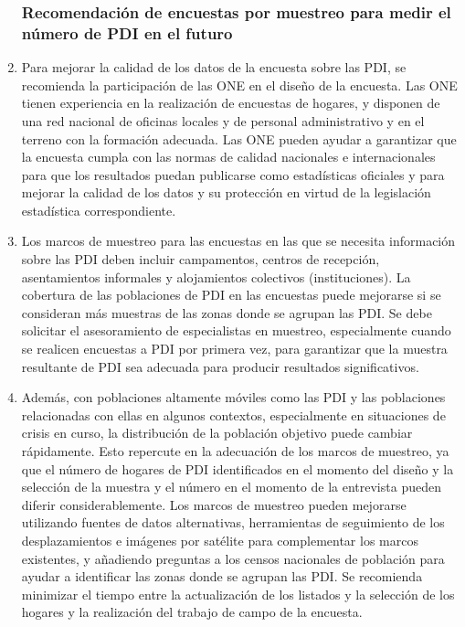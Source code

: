 \documentclass[
]{book}
\begin{document}
\begin{enumerate}
{  \subsubsection{Recomendación de encuestas por muestreo para medir el número de PDI en el futuro}\label{recomendaciuxf3n-de-encuestas-por-muestreo-para-medir-el-nuxfamero-de-pdi-en-el-futuro}}
\item
  Para mejorar la calidad de los datos de la encuesta sobre las PDI, se recomienda la participación de las ONE en el diseño de la encuesta. Las ONE tienen experiencia en la realización de encuestas de hogares, y disponen de una red nacional de oficinas locales y de personal administrativo y en el terreno con la formación adecuada. Las ONE pueden ayudar a garantizar que la encuesta cumpla con las normas de calidad nacionales e internacionales para que los resultados puedan publicarse como estadísticas oficiales y para mejorar la calidad de los datos y su protección en virtud de la legislación estadística correspondiente.
\item
  Los marcos de muestreo para las encuestas en las que se necesita información sobre las PDI deben incluir campamentos, centros de recepción, asentamientos informales y alojamientos colectivos (instituciones). La cobertura de las poblaciones de PDI en las encuestas puede mejorarse si se consideran más muestras de las zonas donde se agrupan las PDI. Se debe solicitar el asesoramiento de especialistas en muestreo, especialmente cuando se realicen encuestas a PDI por primera vez, para garantizar que la muestra resultante de PDI sea adecuada para producir resultados significativos.
\item
  Además, con poblaciones altamente móviles como las PDI y las poblaciones relacionadas con ellas en algunos contextos, especialmente en situaciones de crisis en curso, la distribución de la población objetivo puede cambiar rápidamente. Esto repercute en la adecuación de los marcos de muestreo, ya que el número de hogares de PDI identificados en el momento del diseño y la selección de la muestra y el número en el momento de la entrevista pueden diferir considerablemente. Los marcos de muestreo pueden mejorarse utilizando fuentes de datos alternativas, herramientas de seguimiento de los desplazamientos e imágenes por satélite para complementar los marcos existentes, y añadiendo preguntas a los censos nacionales de población para ayudar a identificar las zonas donde se agrupan las PDI. Se recomienda minimizar el tiempo entre la actualización de los listados y la selección de los hogares y la realización del trabajo de campo de la encuesta.

\end{enumerate}
\end{document}
